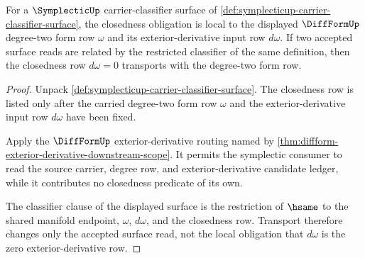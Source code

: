 \begin{theorem}
\label{thm:symplecticup-closed-two-form-obligation}
For a $\SymplecticUp$ carrier-classifier surface of \autoref{def:symplecticup-carrier-classifier-surface}, the closedness obligation is local to the displayed $\DiffFormUp$ degree-two form row $\omega$ and its exterior-derivative input row $d\omega$. If two accepted surface reads are related by the restricted classifier of the same definition, then the closedness row $d\omega=0$ transports with the degree-two form row.
\end{theorem}
\begin{proof}
Unpack \autoref{def:symplecticup-carrier-classifier-surface}. The closedness row is listed only after the carried degree-two form row $\omega$ and the exterior-derivative input row $d\omega$ have been fixed.

Apply the $\DiffFormUp$ exterior-derivative routing named by \autoref{thm:diffform-exterior-derivative-downstream-scope}. It permits the symplectic consumer to read the source carrier, degree row, and exterior-derivative candidate ledger, while it contributes no closedness predicate of its own.

The classifier clause of the displayed surface is the restriction of $\hsame$ to the shared manifold endpoint, $\omega$, $d\omega$, and the closedness row. Transport therefore changes only the accepted surface read, not the local obligation that $d\omega$ is the zero exterior-derivative row.
\end{proof}

